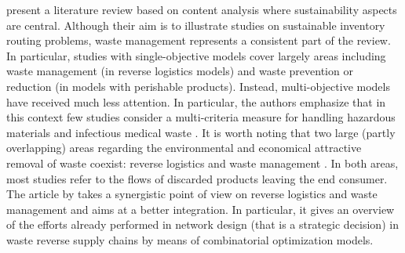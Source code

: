 \documentclass[preprint,11pt,authoryear]{elsarticle}
\begin{document}
\cite{Malladi2018} present a literature review based on content analysis where sustainability aspects are central. Although their aim is to illustrate studies on sustainable inventory routing problems, waste management represents a consistent part of the review. In particular, studies with single-objective models cover largely areas including waste management (in reverse logistics models) and waste prevention or reduction (in models with perishable products). Instead, multi-objective models have received much less attention. In particular, the authors emphasize that in this context few studies consider a multi-criteria measure for handling hazardous materials \citep{DeMaio2025} and infectious medical waste \citep{Wang2023}. 
%
It is worth noting that two large (partly overlapping) areas regarding the environmental and economical attractive removal of waste coexist: reverse logistics and waste management \citep{DeMaio2026}. In both areas, most studies refer to the flows of discarded products leaving the end consumer. The article by \cite{VanEngeland2020} takes a synergistic point of view on reverse logistics and waste management and aims at a better integration. In particular, it gives an overview of the efforts already performed in network design (that is a strategic decision) in waste reverse supply chains by means of combinatorial optimization models. 
\end{document}
